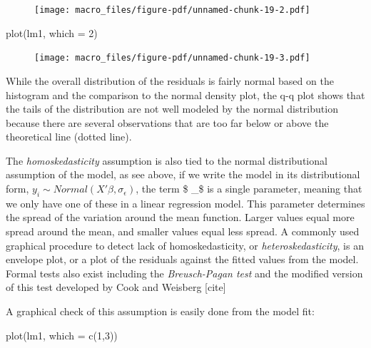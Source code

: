 \documentclass[
  letterpaper,
  DIV=11,
  numbers=noendperiod]{scrreprt}
\newenvironment{Shaded}{\begin{snugshade}}{\end{snugshade}}
\newcommand{\AttributeTok}[1]{\textcolor[rgb]{0.40,0.45,0.13}{#1}}
\newcommand{\DecValTok}[1]{\textcolor[rgb]{0.68,0.00,0.00}{#1}}
\newcommand{\FunctionTok}[1]{\textcolor[rgb]{0.28,0.35,0.67}{#1}}
\newcommand{\NormalTok}[1]{\textcolor[rgb]{0.00,0.23,0.31}{#1}}
\begin{document}
\begin{figure}[H]

{\centering \texttt{[image: macro\_files/figure-pdf/unnamed-chunk-19-2.pdf]}

}

\end{figure}

\begin{Shaded}
\begin{Highlighting}[]
\FunctionTok{plot}\NormalTok{(lm1, }\AttributeTok{which =} \DecValTok{2}\NormalTok{)}
\end{Highlighting}
\end{Shaded}

\begin{figure}[H]

{\centering \texttt{[image: macro\_files/figure-pdf/unnamed-chunk-19-3.pdf]}

}

\end{figure}

While the overall distribution of the residuals is fairly normal based
on the histogram and the comparison to the normal density plot, the q-q
plot shows that the tails of the distribution are not well modeled by
the normal distribution because there are several observations that are
too far below or above the theoretical line (dotted line).

The \emph{homoskedasticity} assumption is also tied to the normal
distributional assumption of the model, as see above, if we write the
model in its distributional form,
\(y_i \sim Normal(X' \beta, \sigma_\epsilon)\), the term \$
\sigma\_\epsilon\$ is a single parameter, meaning that we only have one
of these in a linear regression model. This parameter determines the
spread of the variation around the mean function. Larger values equal
more spread around the mean, and smaller values equal less spread. A
commonly used graphical procedure to detect lack of homoskedasticity, or
\emph{heteroskedasticity}, is an envelope plot, or a plot of the
residuals against the fitted values from the model. Formal tests also
exist including the \emph{Breusch-Pagan test} and the modified version
of this test developed by Cook and Weisberg {[}cite{]}

A graphical check of this assumption is easily done from the model fit:

\begin{Shaded}
\begin{Highlighting}[]
\FunctionTok{plot}\NormalTok{(lm1, }\AttributeTok{which =} \FunctionTok{c}\NormalTok{(}\DecValTok{1}\NormalTok{,}\DecValTok{3}\NormalTok{))}
\end{Highlighting}
\end{Shaded}
\end{document}
